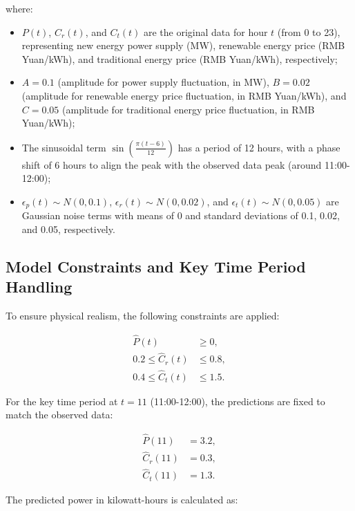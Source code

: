 \documentclass[a4paper,12pt]{article}
\begin{document}
where:
\begin{itemize}
    \item \( P(t) \), \( C_r(t) \), and \( C_t(t) \) are the original data for hour \( t \) (from 0 to 23), representing new energy power supply (MW), renewable energy price (RMB Yuan/kWh), and traditional energy price (RMB Yuan/kWh), respectively;
    \item \( A = 0.1 \) (amplitude for power supply fluctuation, in MW), \( B = 0.02 \) (amplitude for renewable energy price fluctuation, in RMB Yuan/kWh), and \( C = 0.05 \) (amplitude for traditional energy price fluctuation, in RMB Yuan/kWh);
    \item The sinusoidal term \( \sin\left(\frac{\pi (t - 6)}{12}\right) \) has a period of 12 hours, with a phase shift of 6 hours to align the peak with the observed data peak (around 11:00-12:00);
    \item \( \epsilon_p(t) \sim N(0, 0.1) \), \( \epsilon_r(t) \sim N(0, 0.02) \), and \( \epsilon_t(t) \sim N(0, 0.05) \) are Gaussian noise terms with means of 0 and standard deviations of 0.1, 0.02, and 0.05, respectively.
\end{itemize}

\subsection{Model Constraints and Key Time Period Handling}

To ensure physical realism, the following constraints are applied:

\begin{align}
\hat{P}(t) &\geq 0, \label{eq:power_constraint} \\
0.2 \leq \hat{C}_r(t) &\leq 0.8, \label{eq:renew_price_constraint} \\
0.4 \leq \hat{C}_t(t) &\leq 1.5. \label{eq:trad_price_constraint}
\end{align}

For the key time period at \( t = 11 \) (11:00-12:00), the predictions are fixed to match the observed data:

\begin{align}
\hat{P}(11) &= 3.2, \label{eq:power_key} \\
\hat{C}_r(11) &= 0.3, \label{eq:renew_price_key} \\
\hat{C}_t(11) &= 1.3. \label{eq:trad_price_key}
\end{align}

The predicted power in kilowatt-hours is calculated as:
\end{document}
